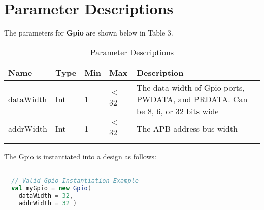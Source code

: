 
\section{Parameter Descriptions}

The parameters for \textbf{Gpio} are shown below in
Table 3.

\renewcommand*{\arraystretch}{1.4}
\begin{longtable}[H]{
    | p{}
    | p{}
    | p{}
    | p{}
    | p{} |
  }
  \hline
  \textbf{Name} &
  \textbf{Type} &
  \textbf{Min}  &
  \textbf{Max}  &
  \textbf{Description}            \\ \hline \hline

  dataWidth   &
  Int       &
  1         &
  $\leq$ 32          &
  The data width of Gpio ports, PWDATA, and PRDATA. Can be 8, 6, or 32 bits wide \\ \hline

  addrWidth     &
  Int           &
  1             &
  $\leq$ 32       &
  The APB address bus width  \\ \hline

  \caption{Parameter Descriptions}\label{table:params}
\end{longtable}

The Gpio is instantiated into a design as follows:

\begin{lstlisting}[language=Scala]

  // Valid Gpio Instantiation Example
  val myGpio = new Gpio(
    dataWidth = 32, 
    addrWidth = 32 ) 

  \end{lstlisting}